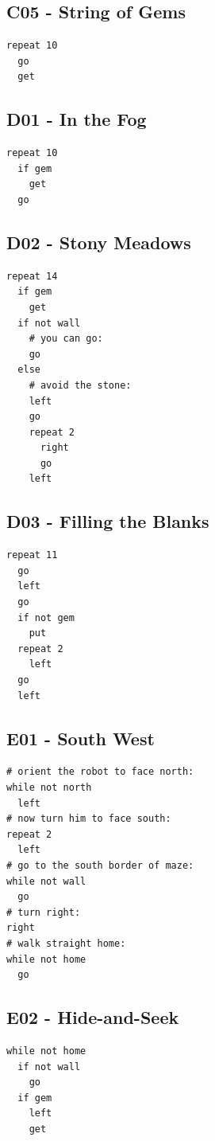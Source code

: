 \documentclass[article,A4,12pt]{llncs}
\begin{document}
\subsection{C05 - String of Gems}
\begin{verbatim}
repeat 10
  go
  get
\end{verbatim}

\subsection{D01 - In the Fog}
\begin{verbatim}
repeat 10
  if gem
    get
  go
\end{verbatim}

\subsection{D02 - Stony Meadows}
\begin{verbatim}
repeat 14
  if gem
    get
  if not wall
    # you can go:
    go
  else
    # avoid the stone:
    left
    go
    repeat 2
      right
      go
    left
\end{verbatim}

\subsection{D03 - Filling the Blanks}
\begin{verbatim}
repeat 11
  go
  left
  go
  if not gem
    put
  repeat 2
    left
  go
  left
\end{verbatim}


\subsection{E01 - South West}
\begin{verbatim}
# orient the robot to face north:
while not north
  left
# now turn him to face south:
repeat 2
  left
# go to the south border of maze:
while not wall
  go
# turn right:
right
# walk straight home:
while not home
  go
\end{verbatim}

\subsection{E02 - Hide-and-Seek}
\begin{verbatim}
while not home
  if not wall
    go
  if gem
    left
    get
\end{verbatim}
\end{document}
